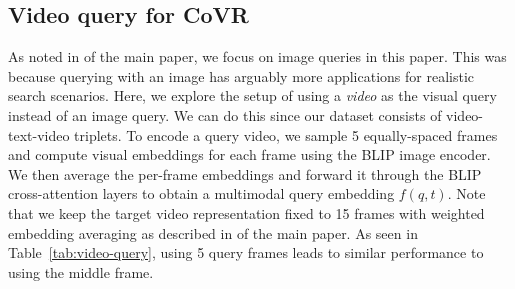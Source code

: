 \begin{table}\caption{\textbf{Prompting versus finetuning LLM:} 
    \label{tab:prompting-mtg-llm}
    We compare our finetuned model (MTG-LLM) to a prompting baseline (see Section~\ref{app:subsec:llm}) and observe important gains in the downstream performance of the model trained on the generated data.
    }
    \centering
\end{table}

 

\subsection{Video query for CoVR}
\label{app:subsec:video-query}
As noted in
\if{} \fi
of the main paper,
we focus on image queries in this paper. This was because querying with an image
has arguably more applications for realistic search scenarios.
Here, we explore the setup of using a \textit{video} as the visual query instead of an image query.
We can do this since our dataset consists of video-text-video triplets.
To encode a query video, we sample 5 equally-spaced frames and compute visual
embeddings for each frame using the BLIP image encoder.
We then average the per-frame
embeddings and forward it through the BLIP cross-attention layers to obtain a multimodal query embedding $f(q,t)$.
Note that we keep the target video representation fixed to 15 frames with weighted embedding averaging
as described in
\if{} \fi
of the main paper.
As seen in Table~\ref{tab:video-query}, using 5 query frames leads to
similar performance to using the middle frame.

